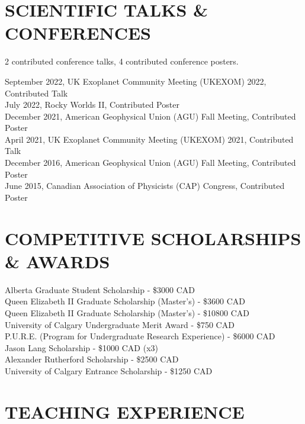 \documentclass[letter, margin, 10pt]{res} %
\begin{document}
\begin{resume}
\parskip \baselineskip
\vspace{-6pt}
\section{SCIENTIFIC TALKS \& CONFERENCES}
2 contributed conference talks, 4 contributed conference posters.

\vspace{-4pt}
September 2022, UK Exoplanet Community Meeting (UKEXOM) 2022, Contributed Talk \\
July 2022, Rocky Worlds II, Contributed Poster \\
December 2021, American Geophysical Union (AGU) Fall Meeting, Contributed Poster\\
April 2021, UK Exoplanet Community Meeting (UKEXOM) 2021, Contributed Talk\\
December 2016, American Geophysical Union (AGU) Fall Meeting, Contributed Poster\\
June 2015, Canadian Association of Physicists (CAP) Congress, Contributed Poster

\section{COMPETITIVE SCHOLARSHIPS \& AWARDS}
\vspace{4pt}
Alberta Graduate Student Scholarship - \$3000 CAD\hfill{}\\
Queen Elizabeth II Graduate Scholarship (Master's) - \$3600 CAD\hfill{}\\
Queen Elizabeth II Graduate Scholarship (Master's) - \$10800 CAD\hfill{}\\
University of Calgary Undergraduate Merit Award - \$750 CAD\hfill{}\\
P.U.R.E. (Program for Undergraduate Research Experience) - \$6000 CAD\hfill{}\\
Jason Lang Scholarship - \$1000 CAD (x3)\hfill{}\\
Alexander Rutherford Scholarship - \$2500 CAD\hfill{}\\
University of Calgary Entrance Scholarship - \$1250 CAD\hfill{}
\section{TEACHING EXPERIENCE}


\end{resume}
\end{document}
